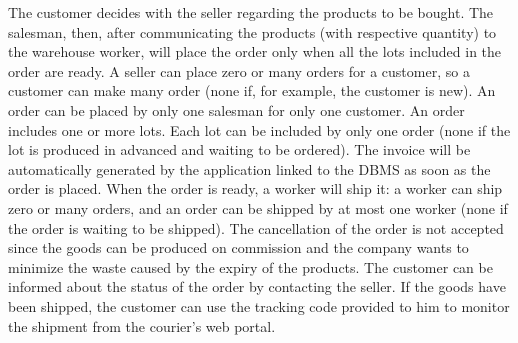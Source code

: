 The customer decides with the seller regarding the products to be bought. The salesman, then, after communicating the products (with respective quantity) to the warehouse worker, will place the order only when all the lots included in the order are ready. A seller can place zero or many orders for a customer, so a customer can make many order (none if, for example, the customer is new). An order can be placed by only one salesman for only one customer. An order includes one or more lots. Each lot can be included by only one order (none if the lot is produced in advanced and waiting to be ordered). The invoice will be automatically generated by the application linked to the DBMS as soon as the order is placed.
When the order is ready, a worker will ship it: a worker can ship zero or many orders, and an order can be shipped by at most one worker (none if the order is waiting to be shipped). The cancellation of the order is not accepted since the goods can be produced on commission and the company wants to minimize the waste caused by the expiry of the products. The customer can be informed about the status of the order by contacting the seller. If the goods have been shipped, the customer can use the tracking code provided to him to monitor the shipment from the courier's web portal.
